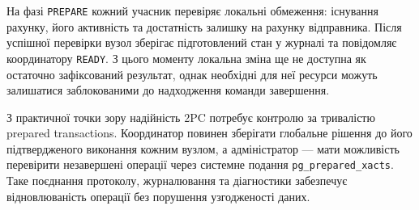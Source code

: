 На фазі \texttt{PREPARE} кожний учасник перевіряє локальні обмеження: існування рахунку, його активність та достатність залишку на рахунку відправника. Після успішної перевірки вузол зберігає підготовлений стан у журналі та повідомляє координатору \texttt{READY}. З цього моменту локальна зміна ще не доступна як остаточно зафіксований результат, однак необхідні для неї ресурси можуть залишатися заблокованими до надходження команди завершення.

З практичної точки зору надійність 2PC потребує контролю за тривалістю prepared transactions. Координатор повинен зберігати глобальне рішення до його підтвердженого виконання кожним вузлом, а адміністратор --- мати можливість перевірити незавершені операції через системне подання \texttt{pg\_prepared\_xacts}. Таке поєднання протоколу, журналювання та діагностики забезпечує відновлюваність операції без порушення узгодженості даних.
